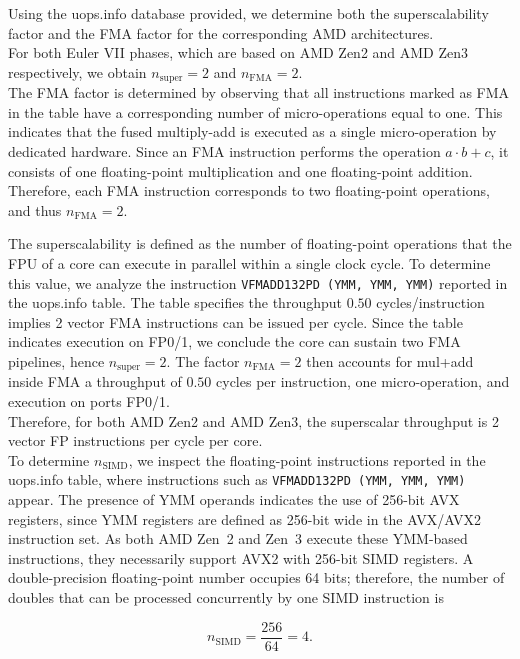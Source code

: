 \documentclass[unicode,10pt,a4paper,oneside,numbers=endperiod,openany]{scrartcl}
\begin{document}
Using the uops.info database provided, we determine both the superscalability factor and the FMA factor for the corresponding AMD architectures. \\
For both Euler VII phases, which are based on AMD Zen2 and AMD Zen3 respectively, we obtain $n_{\text{super}} = 2$ and $n_{\text{FMA}} = 2$.\\

The FMA factor is determined by observing that all instructions marked as FMA in the table have a corresponding number of micro-operations equal to one. This indicates that the fused multiply-add is executed as a single micro-operation by dedicated hardware. Since an FMA instruction performs the operation $a \cdot b + c$, it consists of one floating-point multiplication and one floating-point addition. Therefore, each FMA instruction corresponds to two floating-point operations, and thus $n_{\text{FMA}} = 2$.

The superscalability is defined as the number of floating-point operations that the FPU of a core can execute in parallel within a single clock cycle. To determine this value, we analyze the instruction \texttt{VFMADD132PD (YMM, YMM, YMM)} reported in the uops.info table. The table specifies the throughput $0.50$ cycles/instruction implies 2 vector FMA instructions can be issued per cycle. Since the table indicates execution on FP0/1, we conclude the core can sustain two FMA pipelines, hence $n_{\text{super}} = 2$. The factor $n_{\text{FMA}}=2$ then accounts for mul+add inside FMA a throughput of $0.50$ cycles per instruction, one micro-operation, and execution on ports FP0/1.\\
Therefore, for both AMD Zen2 and AMD Zen3, the superscalar throughput is 2 vector FP instructions per cycle per core.\\

To determine $n_{\text{SIMD}}$, we inspect the floating-point instructions reported in the uops.info table, where instructions such as \texttt{VFMADD132PD (YMM, YMM, YMM)} appear. The presence of YMM operands indicates the use of 256-bit AVX registers, since YMM registers are defined as 256-bit wide in the AVX/AVX2 instruction set. As both AMD Zen~2 and Zen~3 execute these YMM-based instructions, they necessarily support AVX2 with 256-bit SIMD registers. A double-precision floating-point number occupies 64 bits; therefore, the number of doubles that can be processed concurrently by one SIMD instruction is

$$
n_{\text{SIMD}} = \frac{256}{64} = 4.
$$
\end{document}
